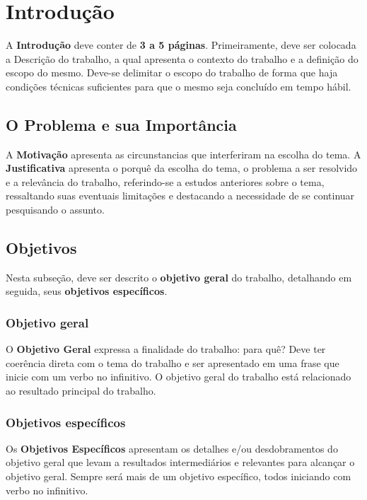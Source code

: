 \chapter{Introdução}
\label{sec-intro}



A \textbf{Introdução} deve conter de \textbf{3 a 5 páginas}. Primeiramente, deve ser colocada a
Descrição do trabalho, a qual apresenta o contexto do trabalho e a definição do escopo do
mesmo. Deve-se delimitar o escopo do trabalho de forma que haja condições
técnicas suficientes para que o mesmo seja concluído em tempo hábil. \cite{albert1999internet}


\section{O Problema e sua Importância}
\label{sec-intro-probimp}

A \textbf{Motivação} apresenta as circunstancias que interferiram na escolha do tema.
A \textbf{Justificativa} apresenta o porquê da escolha do tema, o problema a ser resolvido
e a relevância do trabalho, referindo-se a estudos anteriores sobre o tema, ressaltando
suas eventuais limitações e destacando a necessidade de se continuar pesquisando o
assunto.


\section{Objetivos}
\label{sec-intro-obj}

Nesta subseção, deve ser descrito o \textbf{objetivo geral} do trabalho, detalhando em
seguida, seus \textbf{objetivos específicos}.
\subsection{Objetivo geral}
O \textbf{Objetivo Geral} expressa a finalidade do trabalho: para quê? Deve ter coerência
direta com o tema do trabalho e ser apresentado em uma frase que inicie com um verbo
no infinitivo. O objetivo geral do trabalho está relacionado ao resultado principal do trabalho.
\subsection{Objetivos específicos}
Os \textbf{Objetivos Específicos} apresentam os detalhes e/ou desdobramentos do
objetivo geral que levam a resultados intermediários e relevantes para alcançar o objetivo geral. Sempre será mais de um objetivo específico, todos iniciando com verbo no infinitivo.


